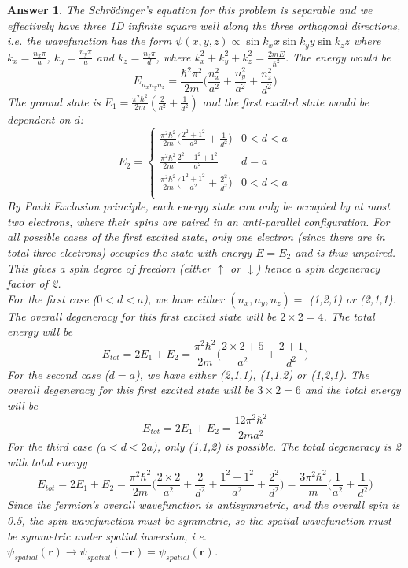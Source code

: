 \documentclass[a4paper]{article}
\newtheorem{ans}{Answer}[section]
\theoremstyle{new}
\begin{document}
\begin{ans}
The Schr\"{o}dinger's equation for this problem is separable and we effectively have three 1D infinite square well along the three orthogonal directions, i.e. the wavefunction has the form $\psi(x,y,z)\propto \sin k_x x\sin k_yy\sin k_zz$ where $k_x=\frac{n_x\pi}{a}$, $k_y=\frac{n_y\pi}{a}$ and $k_z=\frac{n_z\pi}{d}$, where $k_x^2+k_y^2+k_z^2=\frac{2mE}{\hbar^2}$. The energy would be
$$E_{n_xn_yn_z}=\frac{\hbar^2\pi^2}{2m}\bigg(\frac{n_x^2}{a^2}+\frac{n_y^2}{a^2}+\frac{n_z^2}{d^2}\bigg)$$
The ground state is $E_1=\frac{\pi^2\hbar^2}{2m}(\frac{2}{a^2}+\frac{1}{d^2})$ and the first excited state would be dependent on $d$:
$$E_2=
\left\{
        \begin{array}{ll}
      \frac{\pi^2\hbar^2}{2m}\bigg(\frac{2^2+1^2}{a^2}+\frac{1}{d^2}\bigg)& 0<d<a \\
    \frac{\pi^2\hbar^2}{2m}\frac{2^2+1^2+1^2}{a^2}& d=a \\
    \frac{\pi^2\hbar^2}{2m}\bigg(\frac{1^2+1^2}{a^2}+\frac{2^2}{d^2}\bigg)& 0<d<a \\
        \end{array}
    \right.$$
By Pauli Exclusion principle, each energy state can only be occupied by at most two electrons, where their spins are paired in an anti-parallel configuration. For all possible cases of the first excited state, only one electron (since there are in total three electrons) occupies the state with energy $E=E_2$ and is thus unpaired. This gives a spin degree of freedom (either $\uparrow$ or $\downarrow$) hence a spin degeneracy factor of 2.\\[5pt]
For the first case ($0<d<a$), we have either $(n_x,n_y,n_z)=$ (1,2,1) or (2,1,1). The overall degeneracy for this first excited state will be $2\times2=4$. The total energy will be
$$E_{tot}=2E_1+E_2=\frac{\pi^2\hbar^2}{2m}\bigg(\frac{2\times 2+5}{a^2}+\frac{2+1}{d^2}\bigg)$$
For the second case ($d=a$), we have either (2,1,1), (1,1,2) or (1,2,1). The overall degeneracy for this first excited state will be $3\times 2=6$ and the total energy will be
$$E_{tot}=2E_1+E_2=\frac{12\pi^2\hbar^2}{2ma^2}$$
For the third case ($a<d<2a$), only (1,1,2) is possible. The total degeneracy is 2 with total energy
$$E_{tot}=2E_1+E_2=\frac{\pi^2\hbar^2}{2m}\bigg(\frac{2\times 2}{a^2}+\frac{2}{d^2}+\frac{1^2+1^2}{a^2}+\frac{2^2}{d^2}\bigg)=\frac{3\pi^2\hbar^2}{m}\bigg(\frac{1}{a^2}+\frac{1}{d^2}\bigg)$$
Since the fermion's overall wavefunction is antisymmetric, and the overall spin is 0.5, the spin wavefunction must be symmetric, so the spatial wavefunction must be symmetric under spatial inversion, i.e. $\psi_{spatial}(\mathbf{r})\rightarrow\psi_{spatial}(-\mathbf{r})=\psi_{spatial}(\mathbf{r})$.
\end{ans}
\end{document}
